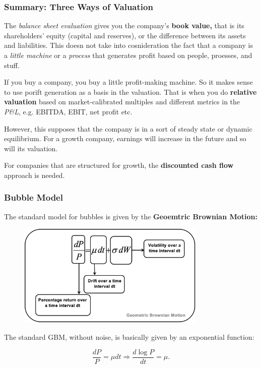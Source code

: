 \documentclass[a4paper]{extarticle}
\begin{document}
\subsubsection{Summary: Three Ways of Valuation}

The \textit{balance sheet evaluation} gives you the company's \textbf{book value,} that is its shareholders' equity (capital and reserves), or the difference between its assets and liabilities. This doesn not take into cosnideration the fact that a company is a \textit{little machine} or a \textit{process} that generates profit based on people, proesses, and stuff.

If you buy a company, you buy a little profit-making machine. So it makes sense to use porift generation as a basis in the valuation. That is when you do \textbf{relative valuation} based on market-calibrated multiples and different metrics in the \textit{P\&L}, e.g. EBITDA, EBIT, net profit etc.

However, this supposes that the company is in a sort of steady state or dynamic equilibrium. For a growth company, earnings will increase in the future and so will its valuation.

For companies that are structured for growth, the \textbf{discounted cash flow} approach is needed.

\subsubsection{Bubble Model}

The standard model for bubbles is given by the \textbf{Geoemtric Brownian Motion:}

\begin{figure}[H]
    \includegraphics[width=9cm]{../images/EnpRisk_Fig4-2}
    \centering
\end{figure}

The standard GBM, without noise, is basically given by an exponential function:

\[
    \frac{dP}{P} = \mu dt \Rightarrow \frac{d\log P}{dt} = \mu.
\]
\end{document}

